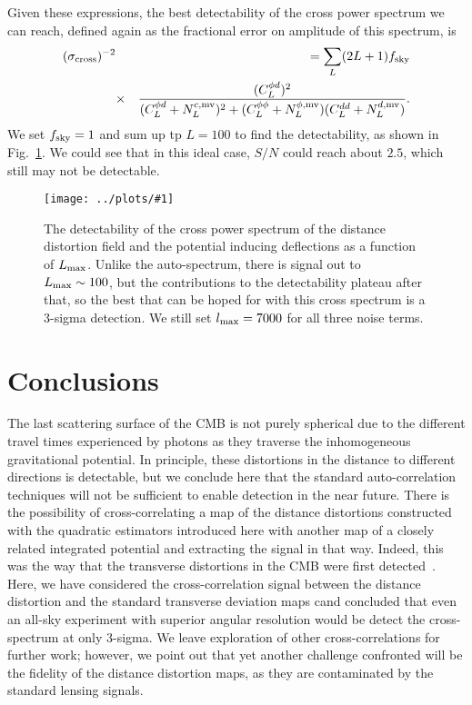 \documentclass[prl,amsmath,amssymb,floatfix,superscriptaddress,nofootinbib,twocolumn]{revtex4-1}
\def\be{\begin{equation}}
\def\bea{\begin{eqnarray}}
\def\eea{\end{eqnarray}}
\newcommand{\vs}{\nonumber\\}
\newcommand{\eql}[1]{\label{eq:#1}}
\newcommand{\sfig}[2]{
\texttt{[image: ../plots/\#1]}
        }
\newcommand{\Sfig}[2]{
   \begin{figure}[thbp]
   \begin{center}
    \sfig{#1.pdf}{\columnwidth}
    \caption{{\small #2}}
    \label{fig:#1}
     \end{center}
   \end{figure}
}
\newcommand{\rf}[1]{\ref{fig:#1}}
\begin{document}
Given these expressions, the best detectability of the cross power spectrum we can reach, defined again as the fractional error on amplitude of this spectrum, is 
\bea
(\sigma_{\rm cross})^{-2} &&= \sum_L (2L+1)f_{\rm sky} \vs
&\times&\frac{(C_L^{\phi d})^2}{( C_L^{\phi d}+N_{L}^{c,\rm mv})^2+
(C_L^{\phi\phi}+N_L^{\phi,\rm mv})(C_L^{dd}+N_L^{d,\rm mv})}.\vs
\eql{sn1}
\eea
We set $f_{\rm sky}=1$ and sum up tp $L=100$ to find the detectability, as shown in Fig.~\rf{CrossStoN}. We could see that in this ideal case, $S/N$ could reach about $2.5$, which still may not be detectable.
\Sfig{CrossStoN}{The detectability of the cross power spectrum of the distance distortion field and the potential inducing deflections as a function of $L_{\rm max}$. Unlike the auto-spectrum, there is signal out to $L_{\rm max}\sim 100$, but the contributions to the detectability plateau after that, so the best that can be hoped for with this cross spectrum is a 3-sigma detection. We still set $l_{\rm max}=7000$ for all three noise terms.}

\section{Conclusions}

The last scattering surface of the CMB is not purely spherical due to the different travel times experienced by photons as they traverse the inhomogeneous gravitational potential. In principle, these distortions in the distance to different directions is detectable, but we conclude here that the standard auto-correlation techniques will not be sufficient to enable detection in the near future. There is the possibility of cross-correlating a map of the distance distortions constructed with the quadratic estimators introduced here with another map of a closely related integrated potential and extracting the signal in that way. Indeed, this was the way that the transverse distortions in the CMB were first detected~\cite{Smith:2007rg}. Here, we have considered  the cross-correlation signal between the distance distortion and the standard transverse deviation maps cand concluded that even an all-sky experiment with superior angular resolution would be detect the cross-spectrum at only 3-sigma. We leave exploration of other cross-correlations for further work; however, we point out that yet another challenge confronted will be the fidelity of the distance distortion maps, as they are contaminated by the standard lensing signals.
\end{document}
